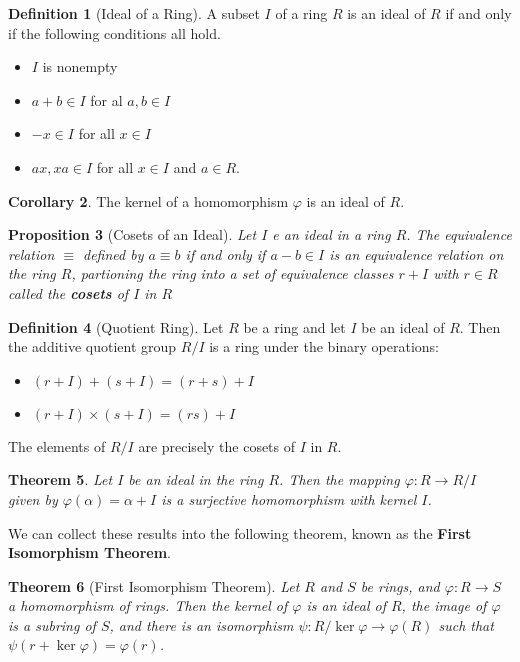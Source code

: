 \documentclass[10pt, oneside, reqno]{amsart}
\theoremstyle{plain}%
\newtheorem{thm}{Theorem}[section]
\newtheorem{prop}[thm]{Proposition}
\theoremstyle{definition}
\newtheorem{defn}[thm]{Definition}
\newtheorem{cor}[thm]{Corollary}
\theoremstyle{remark}
\newcommand{\al}{\alpha}
\begin{document}
\begin{defn}[Ideal of a Ring]
    A subset $I$ of a ring $R$ is an ideal of $R$ if and only if the following conditions all hold.
    \begin{itemize}
        \item $I$ is nonempty
        \item $a + b \in I$ for al $a, b \in I$
        \item $-x \in I$ for all $x \in I$
        \item $ax, xa \in I$ for all $x \in I$ and $a \in R$.
    \end{itemize}
\end{defn}

\begin{cor}
    The kernel of a homomorphism $\varphi$ is an ideal of $R$.
\end{cor}

\begin{prop}[Cosets of an Ideal]
    Let $I$ e an ideal in a ring $R$.  The equivalence relation $\equiv$ defined by $a \equiv b$ if and only if $a - b \in I$ is an equivalence relation on the ring $R$, partioning the ring into a set of equivalence classes $r + I$ with $r \in R$ called the \textbf{cosets} of $I$ in $R$
\end{prop}

\begin{defn}[Quotient Ring]
    Let $R$ be a ring and let $I$ be an ideal of $R$.  Then the additive quotient group $R / I$ is a ring under the binary operations:
    \begin{itemize}
        \item $(r + I) + (s+I) = (r+s) + I$
        \item $(r + I) \times (s + I) = (rs) + I$
    \end{itemize}
    
    The elements of $R/I$ are precisely the cosets of $I$ in $R$.
\end{defn}

\begin{thm}
    Let $I$ be an ideal in the ring $R$.  Then the mapping $\varphi: R \rightarrow R/I$ given by $\varphi(\alpha) = \al + I$ is a surjective homomorphism with kernel $I$.
\end{thm}

We can collect these results into the following theorem, known as the \textbf{First Isomorphism Theorem}.

\begin{thm}[First Isomorphism Theorem]
    Let $R$ and $S$ be rings, and $\varphi: R \rightarrow S$ a homomorphism of rings.  Then the kernel of $\varphi$ is an ideal of $R$, the image of $\varphi$ is a subring of $S$, and there is an isomorphism $\psi: R / \ker \varphi \rightarrow \varphi(R)$ such that $\psi(r + \ker \varphi) = \varphi(r)$. 
\end{thm}
\end{document}
